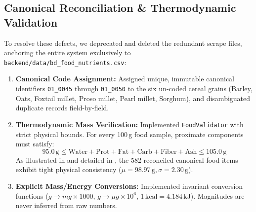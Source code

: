 \documentclass[5p,times,twocolumn]{elsarticle}
\begin{document}
\subsection{Canonical Reconciliation \& Thermodynamic Validation}
To resolve these defects, we deprecated and deleted the redundant scrape files, anchoring the entire system exclusively to \texttt{backend/data/bd\_food\_nutrients.csv}:
\begin{enumerate}[leftmargin=*,itemsep=1.5pt]
  \item \textbf{Canonical Code Assignment:} Assigned unique, immutable canonical identifiers \texttt{01\_0045} through \texttt{01\_0050} to the six un-coded cereal grains (Barley, Oats, Foxtail millet, Proso millet, Pearl millet, Sorghum), and disambiguated duplicate records field-by-field.
  \item \textbf{Thermodynamic Mass Verification:} Implemented \texttt{FoodValidator} with strict physical bounds. For every 100\,g food sample, proximate components must satisfy:
  \begin{equation}
  95.0\,\text{g} \le \text{Water} + \text{Prot} + \text{Fat} + \text{Carb} + \text{Fiber} + \text{Ash} \le 105.0\,\text{g}
  \label{eq:thermo_envelope}
  \end{equation}
  As illustrated in  and detailed in , the 582 reconciled canonical food items exhibit tight physical consistency ($\mu = 98.97\,\text{g}, \sigma = 2.30\,\text{g}$).
  \item \textbf{Explicit Mass/Energy Conversions:} Implemented invariant conversion functions ($g \to mg \times 1000$, $g \to \mu g \times 10^6$, $1\,\text{kcal} = 4.184\,\text{kJ}$). Magnitudes are never inferred from raw numbers.
\end{enumerate}
\end{document}
